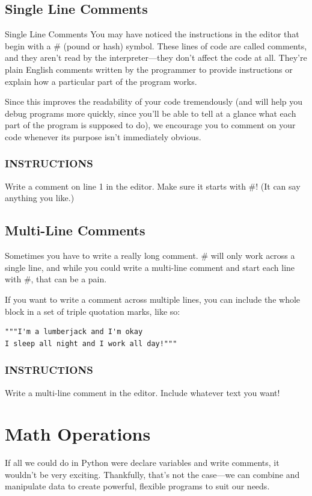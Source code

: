 \documentclass[12pt,a4paper,final,twoside,onecolumn,titlepage]{book}
\begin{document}
\subsection{Single Line Comments}
Single Line Comments
You may have noticed the instructions in the editor that begin with a \# (pound or hash) symbol. These lines of code are called comments, and they aren't read by the interpreter—they don't affect the code at all. They're plain English comments written by the programmer to provide instructions or explain how a particular part of the program works.

Since this improves the readability of your code tremendously (and will help you debug programs more quickly, since you'll be able to tell at a glance what each part of the program is supposed to do), we encourage you to comment on your code whenever its purpose isn't immediately obvious.

\subsubsection{INSTRUCTIONS}
Write a comment on line 1 in the editor. Make sure it starts with \#! (It can say anything you like.)

\subsection{Multi-Line Comments}
Sometimes you have to write a really long comment. \# will only work across a single line, and while you could write a multi-line comment and start each line with \#, that can be a pain.

If you want to write a comment across multiple lines, you can include the whole block in a set of triple quotation marks, like so:
\begin{lstlisting}
"""I'm a lumberjack and I'm okay
I sleep all night and I work all day!"""
\end{lstlisting}

\subsubsection{INSTRUCTIONS}
Write a multi-line comment in the editor. Include whatever text you want!

\section{Math Operations}
If all we could do in Python were declare variables and write comments, it wouldn't be very exciting. Thankfully, that's not the case—we can combine and manipulate data to create powerful, flexible programs to suit our needs.
\end{document}
